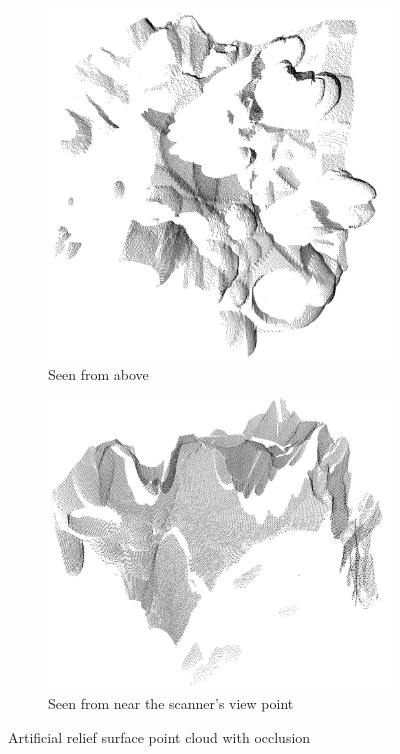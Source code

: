 \begin{figure}[h]
\centering
\begin{subfigure}{.5\textwidth}
	\includegraphics[width=\linewidth]{fig/r1_occlusion.png}
	\caption{Seen from above}
\end{subfigure}%
\begin{subfigure}{.5\textwidth}
	\includegraphics[width=\linewidth]{fig/r1_occlusion2.png}
	\caption{Seen from near the scanner's view point}
\end{subfigure}
\caption{Artificial relief surface point cloud with occlusion}
\label{fig:relief_occlusion}
\end{figure}

